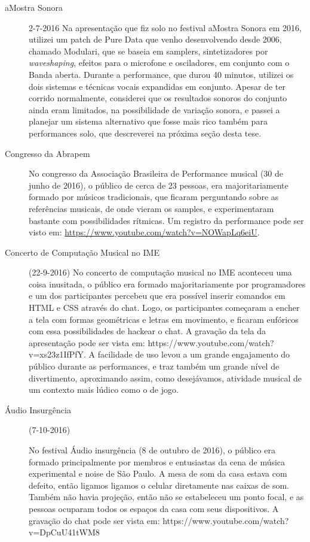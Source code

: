 \begin{description}
\item[aMostra Sonora] 2-7-2016
Na apresentação que fiz solo no festival aMostra Sonora em 2016, utilizei um patch de Pure Data que venho desenvolvendo desde 2006, chamado Modulari, que se baseia em samplers, sintetizadores por \emph{waveshaping}, efeitos para o microfone e osciladores, em conjunto com o Banda aberta. Durante a performance, que durou 40 minutos, utilizei os dois sistemas e técnicas vocais expandidas em conjunto. Apesar de ter corrido normalmente, considerei que os resultados sonoros do conjunto ainda eram limitados, na possibilidade de variação sonora, e passei a planejar um sistema alternativo que fosse mais rico também para performances solo, que descreverei na próxima seção desta tese.


\item[Congresso da Abrapem]
No congresso da Associação Brasileira de Performance musical (30 de junho de 2016), o público de cerca de 23 pessoas, era majoritariamente formado por músicos tradicionais, que ficaram perguntando sobre as referências musicais, de onde vieram os samples, e experimentaram bastante com possibilidades rítmicas. Um registro da performance pode ser visto em:  \url{https://www.youtube.com/watch?v=NOWapLq6eiU}.


\item[Concerto de Computação Musical no IME] (22-9-2016)
No concerto de computação musical no IME aconteceu uma coisa inusitada, o público era formado majoritariamente por programadores e um dos participantes percebeu que era possível inserir comandos em HTML e CSS através do chat. Logo, os participantes começaram a encher a tela com formas geométricas e letras em movimento, e ficaram eufóricos com essa possibilidades de hackear o chat. A gravação da tela da apresentação pode ser vista em: https://www.youtube.com/watch?v=xs23z1IfPfY. A facilidade de uso levou a um grande engajamento do público durante as performances, e traz também um grande nível de divertimento, aproximando assim, como desejávamos, atividade musical de um contexto mais lúdico como o de jogo.

\item[Áudio Insurgência] (7-10-2016)

No festival Áudio insurgência (8 de outubro de 2016), o público era formado principalmente por membros e entusiastas da cena de música experimental e noise de São Paulo. A mesa de som da casa estava com defeito, então ligamos ligamos o celular diretamente nas caixas de som. Também não havia projeção, então não se estabeleceu um ponto focal, e as pessoas ocuparam todos os espaços da casa com seus dispositivos. A gravação do chat pode ser vista em: https://www.youtube.com/watch?v=DpCuU41tWM8 

\end{description}







